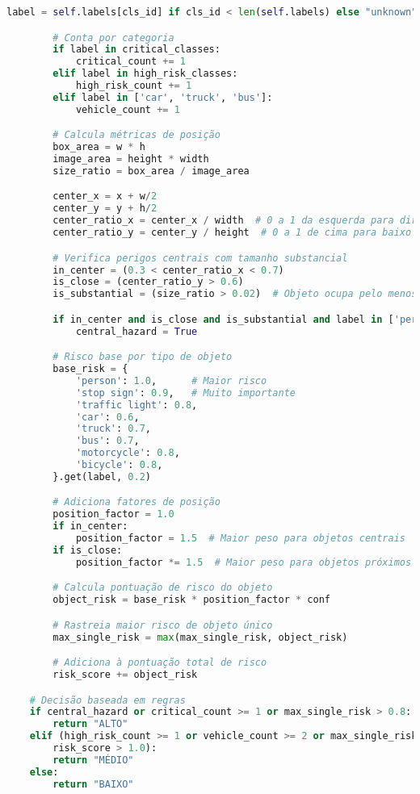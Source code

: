 \documentclass[
	12pt,				%
	oneside, %
	a4paper,			%
	english,			%
	french,				%
	spanish,			%
	brazil				%
	]{abntex2}
\begin{document}
\begin{apendicesenv}
\begin{lstlisting}[language=Python, caption=Método de cálculo de risco de tráfego., label=lst:calculate_traffic_risk]
        label = self.labels[cls_id] if cls_id < len(self.labels) else "unknown"

        # Conta por categoria
        if label in critical_classes:
            critical_count += 1
        elif label in high_risk_classes:
            high_risk_count += 1
        elif label in ['car', 'truck', 'bus']:
            vehicle_count += 1

        # Calcula métricas de posição
        box_area = w * h
        image_area = height * width
        size_ratio = box_area / image_area

        center_x = x + w/2
        center_y = y + h/2
        center_ratio_x = center_x / width  # 0 a 1 da esquerda para direita
        center_ratio_y = center_y / height  # 0 a 1 de cima para baixo

        # Verifica perigos centrais com tamanho substancial
        in_center = (0.3 < center_ratio_x < 0.7)
        is_close = (center_ratio_y > 0.6)
        is_substantial = (size_ratio > 0.02)  # Objeto ocupa pelo menos 2% do frame

        if in_center and is_close and is_substantial and label in ['person', 'car', 'truck', 'motorcycle']:
            central_hazard = True

        # Risco base por tipo de objeto
        base_risk = {
            'person': 1.0,      # Maior risco
            'stop sign': 0.9,   # Muito importante
            'traffic light': 0.8,
            'car': 0.6,
            'truck': 0.7,
            'bus': 0.7,
            'motorcycle': 0.8,
            'bicycle': 0.8,
        }.get(label, 0.2)

        # Adiciona fatores de posição
        position_factor = 1.0
        if in_center:
            position_factor = 1.5  # Maior peso para objetos centrais
        if is_close:
            position_factor *= 1.5  # Maior peso para objetos próximos

        # Calcula pontuação de risco do objeto
        object_risk = base_risk * position_factor * conf

        # Rastreia maior risco de objeto único
        max_single_risk = max(max_single_risk, object_risk)

        # Adiciona à pontuação total de risco
        risk_score += object_risk

    # Decisão baseada em regras
    if central_hazard or critical_count >= 1 or max_single_risk > 0.8:
        return "ALTO"
    elif (high_risk_count >= 1 or vehicle_count >= 2 or max_single_risk > 0.5 or
        risk_score > 1.0):
        return "MÉDIO"
    else:
        return "BAIXO"
\end{lstlisting}


\end{apendicesenv}
\end{document}
